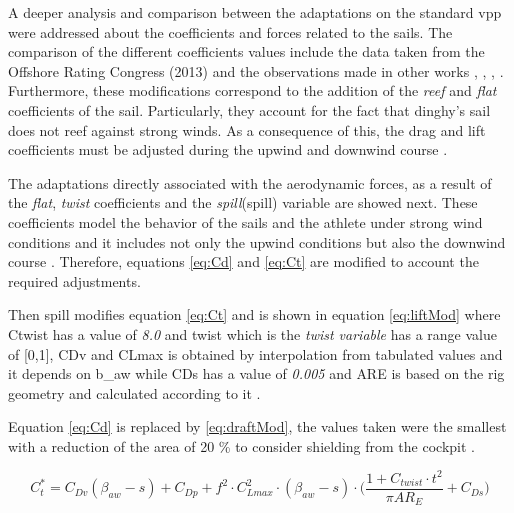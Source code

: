 A deeper analysis and comparison between the adaptations on the standard \acrshort{vpp} were addressed about the coefficients and forces related to the sails. The comparison of the different coefficients values include the data taken from the Offshore Rating Congress (2013) and the observations made in other works \cite{day2017performance}, \cite{carrico17symp}, \cite{binns2002development}, \cite{flay1996twisted}. Furthermore, these modifications correspond to the addition of the \textit{reef} and \textit{flat} coefficients of the sail. Particularly, they account for the fact that dinghy's sail does not reef against strong winds. As a consequence of this, the drag and lift coefficients must be adjusted during the upwind and downwind course \cite{carrico17symp}. \par \noindent
The adaptations directly associated with the 
aerodynamic 
forces, as a result of the \textit{flat}, \textit{twist} coefficients and the \textit{spill}(\acrshort{spill}) variable 
are showed next. These coefficients model the behavior of the sails and the athlete under strong wind conditions and it includes not only the upwind conditions but also the downwind course \cite{day2017performance}. %
Therefore, equations \ref{eq:Cd} and \ref{eq:Ct} are modified to account the required adjustments. \par \noindent 
Then \acrshort{spill} modifies equation \ref{eq:Ct} and is shown in equation \ref{eq:liftMod} where \acrshort{Ctwist} has a value of  \textit{8.0} and \acrshort{twist} which is the \textit{twist variable} has a range value of [0,1], \acrshort{CDv} and \acrshort{CLmax} is obtained by interpolation from tabulated values and it depends on \acrshort{b_aw} while \acrshort{CDs} has a value of \textit{0.005} and \acrshort{ARE} is based on the rig geometry and calculated according to it \cite{day2017performance}. \par \noindent  
Equation \ref{eq:Cd} is replaced by \ref{eq:draftMod}, the values taken were the smallest with a reduction of the area of 20 \% to consider shielding from the cockpit \cite{day2017performance}.\par 

\begin{equation} \label{eq:liftMod}
    C_{t}^*=C_{Dv}(\beta_{aw}-s)+C_{Dp}+f^2 \cdot C_{Lmax}^2 \cdot (\beta_{aw}-s) \cdot \Big(\frac{1+C_{twist} \cdot t^2}{\pi AR_{E}} + C_{Ds}\Big)
\end{equation}

